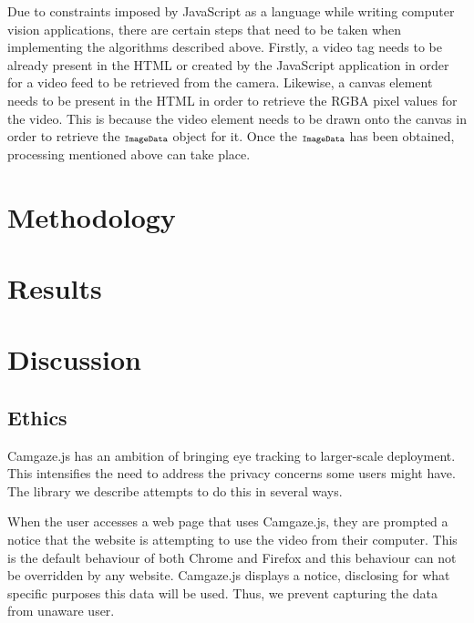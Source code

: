 \documentclass[annual]{acmsiggraph}
\newcommand{\Acronym}[1]{\ensuremath{{\small{\texttt{#1}}}}}
\begin{document}
%
%
%

Due to constraints imposed by JavaScript as a language while writing computer
vision applications, there are certain steps that need to be taken when
implementing the algorithms described above. Firstly, a video tag needs to be
already present in the HTML or created by the JavaScript application in order
for a video feed to be retrieved from the camera. Likewise, a canvas element
needs to be present in the HTML in order to retrieve the RGBA pixel values for
the video.  This is because the video element needs to be drawn onto the canvas
in order to retrieve the $\Acronym{ImageData}$ object for it. Once the
$\Acronym{ImageData}$ has been obtained, processing mentioned above can take
place.

\section{Methodology}

\section{Results}

\section{Discussion}

\subsection{Ethics}

Camgaze.js has an ambition of bringing eye tracking to larger-scale deployment.
This intensifies the need to address the privacy concerns some users might
have. The library we describe attempts to do this in several ways.

When the user accesses a web page that uses Camgaze.js, they are prompted a
notice that the website is attempting to use the video from their computer.
This is the default behaviour of both Chrome and Firefox and this behaviour can
not be overridden by any website. Camgaze.js displays a notice, disclosing for
what specific purposes this data will be used. Thus, we prevent capturing the
data from unaware user.
\end{document}
